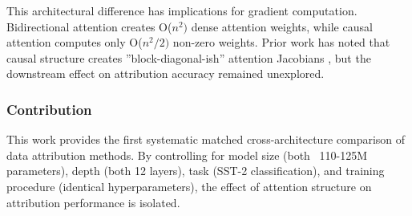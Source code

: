 This architectural difference has implications for gradient computation. Bidirectional attention creates O($n^{2})$ dense attention weights, while causal attention computes only O($n^{2}/2)$ non-zero weights. Prior work has noted that causal structure creates ''block-diagonal-ish'' attention Jacobians \citep{grosse2023studying}, but the downstream effect on attribution accuracy remained unexplored.

\subsubsection{Contribution}

This work provides the first systematic matched cross-architecture comparison of data attribution methods. By controlling for model size (both ~110-125M parameters), depth (both 12 layers), task (SST-2 classification), and training procedure (identical hyperparameters), the effect of attention structure on attribution performance is isolated.
